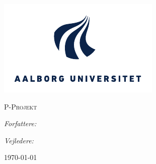 
\begin{titlepage}
  \centering

  \includegraphics[width=\textwidth]{fig/img/aau-logo.pdf}

  \textsc{\LARGE P\projectnumber{}-Projekt}\\
  \textsc{\Large \projectdegree}

  \vspace{2cm}

  {\Huge\bfseries\projecttitle}

  \vspace{0.5cm}

  {\Large\bfseries\sffamily\projectsubtitle}

  \vspace{2cm}

  \begin{minipage}[t]{0.4\textwidth}
    \begin{flushleft}
      \large
      \emph{Forfattere:}\\
      \projectauthors
    \end{flushleft}
  \end{minipage}
  \begin{minipage}[t]{0.4\textwidth}
    \begin{flushright}
      \large
      \emph{Vejledere:}\\
      \projectsupervisors
    \end{flushright}
  \end{minipage}

  \vfill

  {\large\today}
\end{titlepage}
